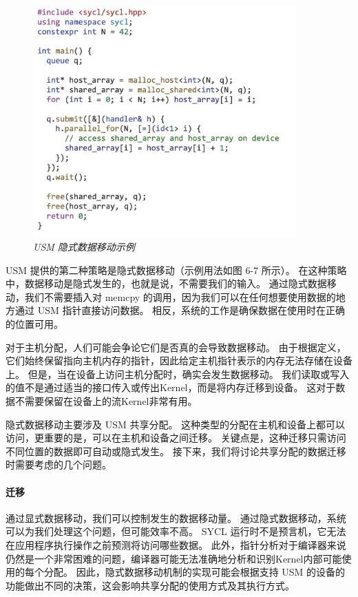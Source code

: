\begin{figure}[H]
	\centering
	\includegraphics[width=0.9\textwidth]{figs/F6.7.png}
	\caption{\textit{USM 隐式数据移动示例}}
\end{figure}

USM 提供的第二种策略是隐式数据移动（示例用法如图 6-7 所示）。 
在这种策略中，数据移动是隐式发生的，也就是说，不需要我们的输入。 
通过隐式数据移动，我们不需要插入对 memcpy 的调用，因为我们可以在任何想要使用数据的地方通过 USM 指针直接访问数据。 
相反，系统的工作是确保数据在使用时在正确的位置可用。

对于主机分配，人们可能会争论它们是否真的会导致数据移动。 
由于根据定义，它们始终保留指向主机内存的指针，因此给定主机指针表示的内存无法存储在设备上。 
但是，当在设备上访问主机分配时，确实会发生数据移动。 
我们读取或写入的值不是通过适当的接口传入或传出Kernel，而是将内存迁移到设备。 
这对于数据不需要保留在设备上的流Kernel非常有用。

隐式数据移动主要涉及 USM 共享分配。 这种类型的分配在主机和设备上都可以访问，更重要的是，可以在主机和设备之间迁移。 
关键点是，这种迁移只需访问不同位置的数据即可自动或隐式发生。 
接下来，我们将讨论共享分配的数据迁移时需要考虑的几个问题。

\paragraph{迁移}

通过显式数据移动，我们可以控制发生的数据移动量。 通过隐式数据移动，系统可以为我们处理这个问题，但可能效率不高。 
SYCL 运行时不是预言机，它无法在应用程序执行操作之前预测将访问哪些数据。 
此外，指针分析对于编译器来说仍然是一个非常困难的问题，编译器可能无法准确地分析和识别Kernel内部可能使用的每个分配。 
因此，隐式数据移动机制的实现可能会根据支持 USM 的设备的功能做出不同的决策，这会影响共享分配的使用方式及其执行方式。


